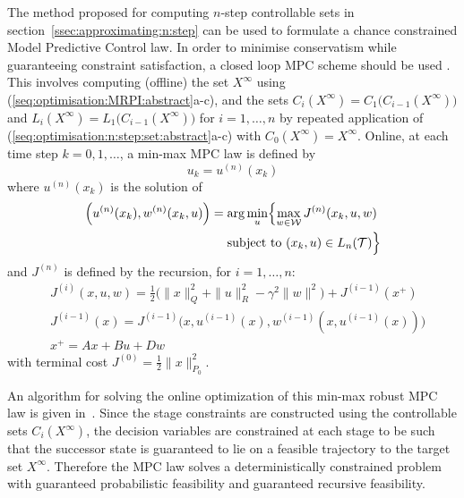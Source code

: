\documentclass{ifacconf}
\providecommand{\W}{\mathcal W}
\providecommand{\T}{\mathcal T}
\begin{document}
The method proposed for computing $n$-step controllable sets in section~\ref{ssec:approximating:n:step} can be used to formulate a chance constrained Model Predictive Control law. In order to minimise conservatism while guaranteeing constraint satisfaction, a closed loop MPC scheme should be used \citep[see e.g.][]{Lee:1997}.
This involves computing (offline) the set $X^\infty$ using \mbox{(\ref{seq:optimisation:MRPI:abstract}a-c)}, and the 
sets $C_{i}(X^\infty) = C_1\bigl(C_{i-1}(X^\infty)\bigr)$ and $L_{i}(X^\infty) = L_1\bigl(C_{i-1}(X^\infty)\bigr)$ 
for $i=1,\ldots,n$ by repeated application of (\ref{seq:optimisation:n:step:set:abstract}a-c) with $C_0(X^\infty)= X^\infty$.
Online, at each time step $k=0,1,\ldots$, a min-max MPC law is defined by 
\[
u_k = u^{(n)}(x_k)
\]
where $u^{(n)}(x_k)$ is the solution of
%
\[%
\begin{aligned}
\Bigl( u^{(n)} (x_k) , w^{(n)} (x_k,u) \Bigr) &= \arg \min_{u} \Bigl\{ \max_{w\in\W} J^{(n)}(x_k,u,w)  
\\
&\ \quad \text{subject to}\ (x_k, u) \in L_n(\T)
\Bigr\}
\end{aligned}
\]%
and $J^{(n)}$ is defined by the recursion, for $i=1,\ldots,n$:
\begin{align*}
&J^{(i)}(x,u,w) = \tfrac{1}{2}\bigl( \| x \|^2_Q + \| u \|^2_R -
\gamma^2 \| w \|^2\bigr) + J^{(i-1)}(x^+) 
\\
&J^{(i-1)}(x) = J^{(i-1)}\bigl(x,u^{(i-1)}(x),w^{(i-1)}(x,u^{(i-1)}(x))\bigr) \\
&x^+ = Ax + Bu + Dw
\end{align*}
with terminal cost $J^{(0)} = \frac{1}{2}\|x\|_{P_0}^2$.

An algorithm for solving the online optimization of this min-max robust MPC law is given in~\citet{Buerger2016}. 
%
Since the stage constraints are constructed using the controllable sets $C_{i}(X^\infty)$, the decision variables are constrained at each stage to be such that the successor state is guaranteed to lie on a feasible trajectory to the target set $X^\infty$. Therefore the MPC law solves a deterministically constrained problem with guaranteed probabilistic feasibility and guaranteed recursive feasibility.
\end{document}
